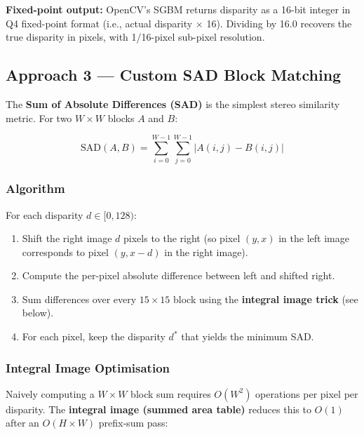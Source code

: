 \documentclass[12pt, a4paper]{article}
\begin{document}
\begin{notebox}
\textbf{Fixed-point output:} OpenCV's SGBM returns disparity as a 16-bit integer
in Q4 fixed-point format (i.e., actual disparity $\times$ 16). Dividing by 16.0
recovers the true disparity in pixels, with 1/16-pixel sub-pixel resolution.
\end{notebox}

\subsection{Approach 3 --- Custom SAD Block Matching}

The \textbf{Sum of Absolute Differences (SAD)} is the simplest stereo similarity
metric. For two $W \times W$ blocks $A$ and $B$:

\begin{formulabox}
\begin{equation}
  \text{SAD}(A, B) = \sum_{i=0}^{W-1} \sum_{j=0}^{W-1} \left| A(i,j) - B(i,j) \right|
\end{equation}
\end{formulabox}

\subsubsection{Algorithm}

For each disparity $d \in [0, 128)$:
\begin{enumerate}
  \item Shift the right image $d$ pixels to the right (so pixel $(y,x)$ in the
        left image corresponds to pixel $(y, x-d)$ in the right image).
  \item Compute the per-pixel absolute difference between left and shifted right.
  \item Sum differences over every $15 \times 15$ block using the
        \textbf{integral image trick} (see below).
  \item For each pixel, keep the disparity $d^*$ that yields the minimum SAD.
\end{enumerate}

\subsubsection{Integral Image Optimisation}

Naively computing a $W \times W$ block sum requires $O(W^2)$ operations per
pixel per disparity. The \textbf{integral image (summed area table)} reduces
this to $O(1)$ after an $O(H \times W)$ prefix-sum pass:
\end{document}
